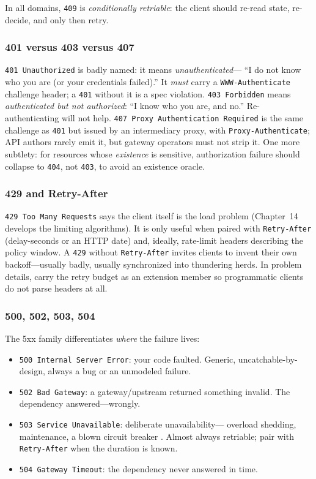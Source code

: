 In all domains, \texttt{409} is \emph{conditionally retriable}: the client
should re-read state, re-decide, and only then retry.

\subsubsection{401 versus 403 versus 407}

\texttt{401 Unauthorized} is badly named: it means \emph{unauthenticated}---
``I do not know who you are (or your credentials failed).'' It
\emph{must} carry a \texttt{WWW-Authenticate} challenge header; a
\texttt{401} without it is a spec violation. \texttt{403 Forbidden} means
\emph{authenticated but not authorized}: ``I know who you are, and no.''
Re-authenticating will not help. \texttt{407 Proxy Authentication Required}
is the same challenge as \texttt{401} but issued by an intermediary proxy,
with \texttt{Proxy-Authenticate}; API authors rarely emit it, but gateway
operators must not strip it. One more subtlety: for resources whose
\emph{existence} is sensitive, authorization failure should collapse to
\texttt{404}, not \texttt{403}, to avoid an existence oracle.

\subsubsection{429 and Retry-After}

\texttt{429 Too Many Requests} says the client itself is the load problem
(Chapter~14 develops the limiting algorithms). It is only useful when paired
with \texttt{Retry-After} (delay-seconds or an HTTP date) and, ideally,
rate-limit headers describing the policy window. A \texttt{429} without
\texttt{Retry-After} invites clients to invent their own backoff---usually
badly, usually synchronized into thundering herds. In problem details, carry
the retry budget as an extension member so programmatic clients do not parse
headers at all.

\subsubsection{500, 502, 503, 504}

The 5xx family differentiates \emph{where} the failure lives:

\begin{itemize}
  \item \texttt{500 Internal Server Error}: your code faulted. Generic,
        uncatchable-by-design, always a bug or an unmodeled failure.
  \item \texttt{502 Bad Gateway}: a gateway/upstream returned something
        invalid. The dependency answered---wrongly.
  \item \texttt{503 Service Unavailable}: deliberate unavailability---
        overload shedding, maintenance, a blown circuit breaker
        \cite{nygard2018releaseit}. Almost always retriable; pair with
        \texttt{Retry-After} when the duration is known.
  \item \texttt{504 Gateway Timeout}: the dependency never answered in time.
\end{itemize}

